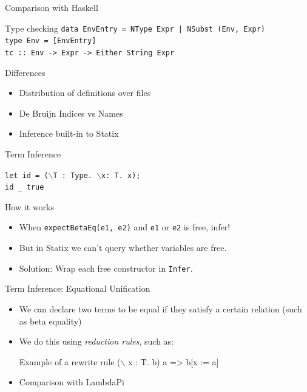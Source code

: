 \documentclass[aspectratio=43]{beamer}
\begin{document}
\begin{frame}{Comparison with Haskell}
	\begin{block}{Type checking}
		\texttt{data EnvEntry = NType Expr | NSubst (Env, Expr)
			\\type Env = [EnvEntry]
			\\tc :: Env -> Expr -> Either String Expr}
	\end{block}

	\begin{block}{Differences}
		\begin{itemize}
			\item Distribution of definitions over files
			\item De Bruijn Indices vs Names
			\item Inference built-in to Statix
		\end{itemize}
	\end{block}
\end{frame}

\begin{frame}{Term Inference}
	\begin{example}\texttt{let id = ($\backslash$T : Type. $\backslash$x: T. x);
	\\id \_ true}
	\end{example}
	\begin{block}{How it works}
		\begin{itemize}
			\item When \texttt{expectBetaEq(e1, e2)} and \texttt{e1} or \texttt{e2} is free, infer!
			\item But in Statix we can't query whether variables are free.
			\item Solution: Wrap each free constructor in \texttt{Infer}.
		\end{itemize}
	\end{block}
\end{frame}

\begin{frame}{Term Inference: Equational Unification}
	\begin{itemize}
		\item We can declare two terms to be equal if they satisfy a certain relation (such as beta equality)
		\item We do this using \emph{reduction rules}, such as:
		\begin{exampleblock}{Example of a rewrite rule}
			($\backslash$ x : T. b) a => b[x := a]
		\end{exampleblock}
		\item Comparison with LambdaPi
	\end{itemize}
\end{frame}
\end{document}
